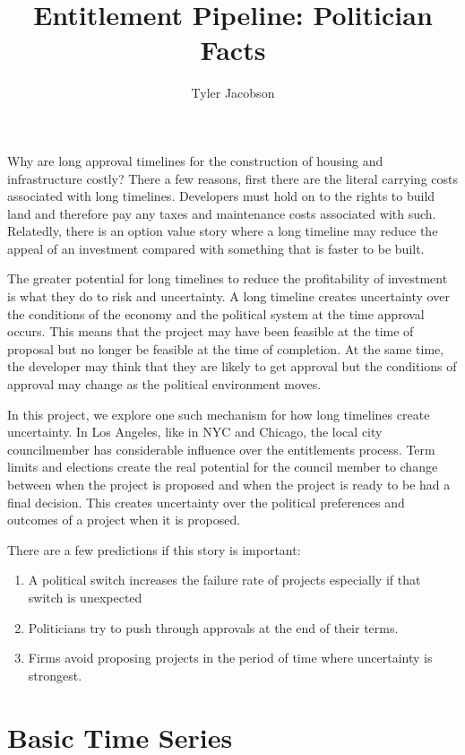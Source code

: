 \documentclass[12pt]{article}
\title{Entitlement Pipeline: Politician Facts}
\author{Tyler Jacobson}
\theoremstyle{definition}
\begin{document}
\maketitle

Why are long approval timelines for the construction of housing and infrastructure costly? There a few reasons, first there are the literal carrying costs associated with long timelines. Developers must hold on to the rights to build land and therefore pay any taxes and maintenance costs associated with such. Relatedly, there is an option value story where a long timeline may reduce the appeal of an investment compared with something that is faster to be built. 

The greater potential for long timelines to reduce the profitability of investment is what they do to risk and uncertainty. A long timeline creates uncertainty over the conditions of the economy and the political system at the time approval occurs. This means that the project may have been feasible at the time of proposal but no longer be feasible at the time of completion. At the same time, the developer may think that they are likely to get approval but the conditions of approval may change as the political environment moves. 

In this project, we explore one such mechanism for how long timelines create uncertainty. In Los Angeles, like in NYC and Chicago, the local city councilmember has considerable influence over the entitlements process. Term limits and elections create the real potential for the council member to change between when the project is proposed and when the project is ready to be had a final decision. This creates uncertainty over the political preferences and outcomes of a project when it is proposed. 

There are a few predictions if this story is important:
\begin{enumerate}
   \item A political switch increases the failure rate of projects especially if that switch is unexpected
   \item Politicians try to push through approvals at the end of their terms.
   \item Firms avoid proposing projects in the period of time where uncertainty is strongest. 
\end{enumerate}

\section{Basic Time Series}
\end{document}
